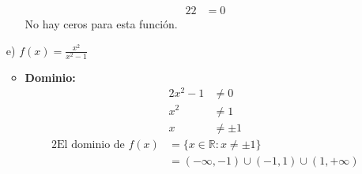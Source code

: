 \documentclass{templateNote}
\begin{document}
\begin{itemize}
\begin{itemize}
\begin{alignat*}{2}
            2 &= 0
        \end{alignat*}
        No hay ceros para esta función.
    \end{itemize}
    \item[e)] $f(x) = \frac{x^2}{x^2 - 1}$
    \begin{itemize}
        \item \textbf{Dominio:}
        \begin{alignat*}{2}
            x^2 - 1 &\neq 0 \\
            x^2 &\neq 1 \\
            x &\neq \pm 1
        \end{alignat*}
        \begin{alignat*}{2}
            \text{El dominio de } f(x) &= \{x \in \mathbb{R} : x \neq \pm 1\} \\
            &= (-\infty, -1) \cup (-1, 1) \cup (1, +\infty)
        \end{alignat*}


\end{itemize}
\end{itemize}
\end{document}
